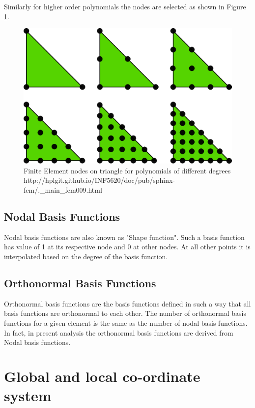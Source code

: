 \documentclass[a4paper,12pt]{book}
\begin{document}
Similarly for higher order polynomials the nodes are selected as shown in Figure \ref{fig:Nodes on Triangular Element}.

\begin{figure}
  \includegraphics[width=\linewidth]{fem_triangle_2.png}
  \caption{Finite Element nodes on triangle for polynomials of different degrees \\ http://hplgit.github.io/INF5620/doc/pub/sphinx-fem/.\_main\_fem009.html}
  \label{fig:Nodes on Triangular Element}
\end{figure}

\subsection{Nodal Basis Functions}

Nodal basis functions are also known as "Shape function". Such a basis function has value of 1 at its respective node and 0 at other nodes. At all other points it is interpolated based on the degree of the basis function. 

\subsection{Orthonormal Basis Functions}

Orthonormal basis functions are the basis functions defined in such a way that all basis functions are orthonormal to each other. The number of orthonormal basis functions for a given element is the same as the number of nodal basis functions. In fact, in present analysis the orthonormal basis functions are derived from Nodal basis functions.

\section{Global and local co-ordinate system}
\end{document}
